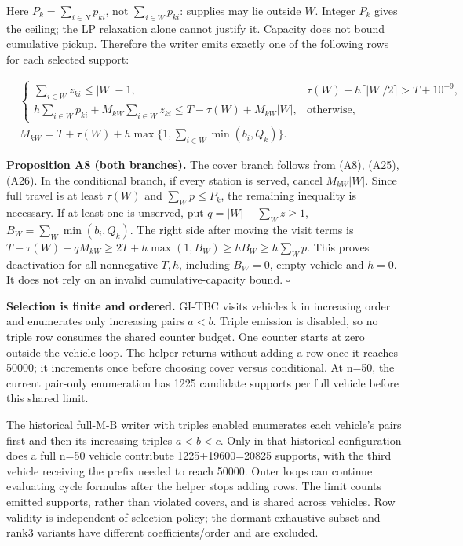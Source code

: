 \documentclass[
  american,
  11pt,
]{article}
\begin{document}
Here \(P_k=\sum_{i\in N}p_{ki}\), not \(\sum_{i\in W}p_{ki}\): supplies
may lie outside \(W\). Integer \(P_k\) gives the ceiling; the LP
relaxation alone cannot justify it. Capacity does not bound cumulative
pickup. Therefore the writer emits exactly one of the following rows for
each selected support:

\[
\begin{aligned}
&\begin{cases}
\sum_{i\in W}z_{ki}\le |W|-1,&\tau(W)+h\lceil|W|/2\rceil>T+10^{-9},\\
h\sum_{i\in W}p_{ki}+M_{kW}\sum_{i\in W}z_{ki}\le T-\tau(W)+M_{kW}|W|,&\text{otherwise},
\end{cases}\\
&M_{kW}=T+\tau(W)+h\max\{1,\sum_{i\in W}\min(b_i,Q_k)\}.
\end{aligned}
\tag{A27}
\]


\textbf{Proposition A8 (both branches).} The cover branch follows from
(A8), (A25), (A26). In the conditional branch, if every station is
served, cancel \(M_{kW}|W|\). Since full travel is at least \(\tau(W)\)
and \(\sum_Wp\le P_k\), the remaining inequality is necessary. If at
least one is unserved, put \(q=|W|-\sum_Wz\ge1\),
\(B_W=\sum_W\min(b_i,Q_k)\). The right side after moving the visit terms
is \(T-\tau(W)+qM_{kW}\ge2T+h\max(1,B_W)\ge hB_W\ge h\sum_Wp\). This
proves deactivation for all nonnegative \(T,h\), including \(B_W=0\),
empty vehicle and \(h=0\). It does not rely on an invalid
cumulative-capacity bound. \(\square\)

\textbf{Selection is finite and ordered.} GI-TBC visits vehicles k in
increasing order and enumerates only increasing pairs \(a<b\). Triple
emission is disabled, so no triple row consumes the shared counter
budget. One counter starts at zero outside the vehicle loop. The helper
returns without adding a row once it reaches 50000; it increments once
before choosing cover versus conditional. At n=50, the current pair-only
enumeration has 1225 candidate supports per full vehicle before this
shared limit.

The historical full-M-B writer with triples enabled enumerates each
vehicle's pairs first and then its increasing triples \(a<b<c\). Only in
that historical configuration does a full n=50 vehicle contribute
1225+19600=20825 supports, with the third vehicle receiving the prefix
needed to reach 50000. Outer loops can continue evaluating cycle
formulas after the helper stops adding rows. The limit counts emitted
supports, rather than violated covers, and is shared across vehicles.
Row validity is independent of selection policy; the dormant
exhaustive-subset and rank3 variants have different coefficients/order
and are excluded.
\end{document}
